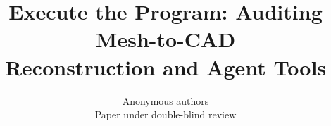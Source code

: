 \documentclass{article}
\title{Execute the Program: Auditing Mesh-to-CAD\\Reconstruction and Agent Tools}
\author{Anonymous authors\\Paper under double-blind review}
\begin{document}
\maketitle

\begin{abstract}

\end{abstract}














\appendix

\end{document}
